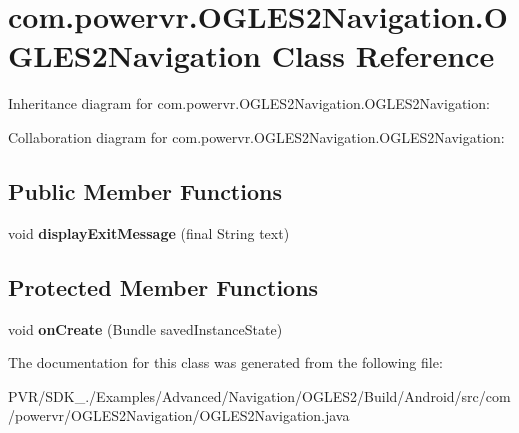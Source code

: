 \hypertarget{classcom_1_1powervr_1_1_o_g_l_e_s2_navigation_1_1_o_g_l_e_s2_navigation}{\section{com.\+powervr.\+O\+G\+L\+E\+S2\+Navigation.\+O\+G\+L\+E\+S2\+Navigation Class Reference}
\label{classcom_1_1powervr_1_1_o_g_l_e_s2_navigation_1_1_o_g_l_e_s2_navigation}
}


Inheritance diagram for com.\+powervr.\+O\+G\+L\+E\+S2\+Navigation.\+O\+G\+L\+E\+S2\+Navigation\+:


Collaboration diagram for com.\+powervr.\+O\+G\+L\+E\+S2\+Navigation.\+O\+G\+L\+E\+S2\+Navigation\+:
\subsection*{Public Member Functions}
\begin{DoxyCompactItemize}
\item 
\hypertarget{classcom_1_1powervr_1_1_o_g_l_e_s2_navigation_1_1_o_g_l_e_s2_navigation_a62eec7d1187d79e0d8a5b4c8b911b431}{void {\bfseries display\+Exit\+Message} (final String text)}\label{classcom_1_1powervr_1_1_o_g_l_e_s2_navigation_1_1_o_g_l_e_s2_navigation_a62eec7d1187d79e0d8a5b4c8b911b431}

\end{DoxyCompactItemize}
\subsection*{Protected Member Functions}
\begin{DoxyCompactItemize}
\item 
\hypertarget{classcom_1_1powervr_1_1_o_g_l_e_s2_navigation_1_1_o_g_l_e_s2_navigation_a208e070b77a404eda4e129d4569148cd}{void {\bfseries on\+Create} (Bundle saved\+Instance\+State)}\label{classcom_1_1powervr_1_1_o_g_l_e_s2_navigation_1_1_o_g_l_e_s2_navigation_a208e070b77a404eda4e129d4569148cd}

\end{DoxyCompactItemize}


The documentation for this class was generated from the following file\+:\begin{DoxyCompactItemize}
\item 
P\+V\+R/\+S\+D\+K\+\_./\+Examples/\+Advanced/\+Navigation/\+O\+G\+L\+E\+S2/\+Build/\+Android/src/com/powervr/\+O\+G\+L\+E\+S2\+Navigation/O\+G\+L\+E\+S2\+Navigation.\+java\end{DoxyCompactItemize}
